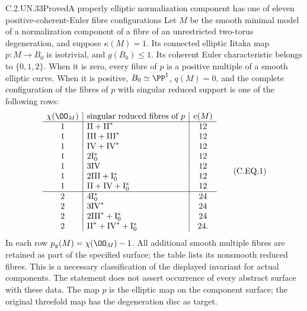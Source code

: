 \begin{statement}{C.2.UN.33}{Proved}{A properly elliptic normalization component has one of eleven positive-coherent-Euler fibre configurations}
Let $M$ be the smooth minimal model of a normalization
component of a fibre of an unrestricted two-torus degeneration,
and suppose $\kappa(M)=1$. Its connected elliptic Iitaka map
$p:M\to B_0$ is isotrivial, and $g(B_0)\le1$.
Its coherent Euler characteristic belongs to $\{0,1,2\}$.
When it is zero, every fibre of $p$ is a positive multiple
of a smooth elliptic curve. When it is positive,
$B_0\simeq\PP^1$, $q(M)=0$, and the complete configuration
of the fibres of $p$ with singular reduced support is one
of the following rows:
\[
\begin{array}{c|l|c}
\chi(\OO_M)&\text{singular reduced fibres of }p&e(M)\\ \hline
1&\mathrm{II}+\mathrm{II}^*&12\\
1&\mathrm{III}+\mathrm{III}^*&12\\
1&\mathrm{IV}+\mathrm{IV}^*&12\\
1&2\mathrm I_0^*&12\\
1&3\mathrm{IV}&12\\
1&2\mathrm{III}+\mathrm I_0^*&12\\
1&\mathrm{II}+\mathrm{IV}+\mathrm I_0^*&12\\ \hline
2&4\mathrm I_0^*&24\\
2&3\mathrm{IV}^*&24\\
2&2\mathrm{III}^*+\mathrm I_0^*&24\\
2&\mathrm{II}^*+\mathrm{IV}^*+\mathrm I_0^*&24 .
\end{array}                                                   \tag{C.EQ.1}
\]
In each row $p_g(M)=\chi(\OO_M)-1$. All additional
smooth multiple fibres are retained as part of the specified
surface; the table lists its nonsmooth reduced fibres.
This is a necessary classification of the displayed
invariant for actual components. The statement does not
assert occurrence of every abstract surface with these data.
The map $p$ is the elliptic map on the component surface;
the original threefold map has the degeneration disc as target.
\end{statement}

